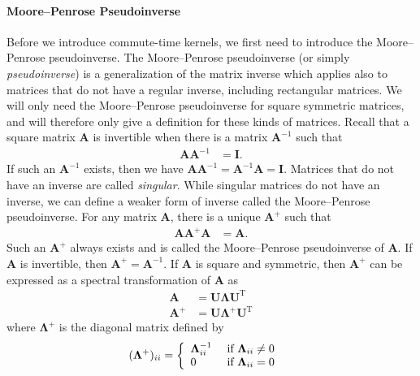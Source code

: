 \documentclass[11pt,a4paper]{book}
\begin{document}
\paragraph{Moore--Penrose Pseudoinverse}
\label{para:pseudoinverse}
Before we introduce commute-time kernels, we first need to introduce the
Moore--Penrose pseudoinverse.  The Moore--Penrose pseudoinverse (or
simply \emph{pseudoinverse}) is a generalization of the matrix inverse
which applies also to matrices that do not have a regular inverse,
including rectangular matrices.  We will only need the 
Moore--Penrose pseudoinverse for square symmetric matrices, and will
therefore only give a definition for these kinds of matrices. 
Recall that a square matrix $\mathbf A$ is invertible when there is a
matrix $\mathbf A^{-1}$ such that
\begin{align*} 
  \mathbf A \mathbf A^{-1} &= \mathbf I. 
\end{align*}
If such an $\mathbf A^{-1}$ exists, then
we have $\mathbf A \mathbf A^{-1} = \mathbf A^{-1} \mathbf A=
\mathbf I$.  Matrices that do not have an inverse are called
\emph{singular}.  While singular matrices do not have an inverse, we can
define a weaker form of inverse called the Moore--Penrose
pseudoinverse.  For any matrix $\mathbf A$, there is a unique $\mathbf
A^+$ such that
\begin{align*}
  \mathbf A \mathbf A^+ \mathbf A &= \mathbf A.
\end{align*}
Such an $\mathbf A^+$ always exists and is called the Moore--Penrose
pseudoinverse of $\mathbf A$.  
If $\mathbf A$ is invertible, then $\mathbf A^+ = \mathbf A^{-1}$. 
If $\mathbf A$ is square and symmetric, then $\mathbf A^+$ can be
expressed as a spectral transformation of $\mathbf A$ as
\begin{align*}
  \mathbf A &= \mathbf U \mathbf \Lambda \mathbf U^{\mathrm T} \\
  \mathbf A^+ &= \mathbf U \mathbf \Lambda^+ \mathbf U^{\mathrm T} 
\end{align*}
where $\mathbf \Lambda^+$ is the diagonal matrix defined by
\begin{align*}
  ( \mathbf \Lambda^+)_{ii} &= 
  \left\{ 
  \begin{array}{ll} \mathbf \Lambda_{ii}^{-1} & \textnormal{ if } \mathbf
    \Lambda_{ii} \neq 0 \\ 0 & \textnormal{ if } \mathbf \Lambda_{ii} =
    0 \end{array} 
  \right. 
\end{align*}
\end{document}
